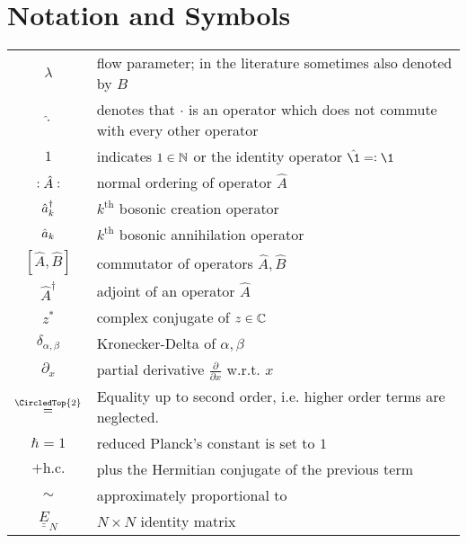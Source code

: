 \chapter*{Notation and Symbols}
\begin{tabular}{cp{}}
  $\lambda$ & flow parameter; in the literature sometimes also denoted by $B$ \\
  $\hat\cdot$ & denotes that $\cdot$ is an operator which does not commute with every other operator\\
  $1$ & indicates $1\in\mathbb{N}$ or the identity operator $\hat{\1}\eqdef \1$\\
  $\vcentcolon \hat A\vcentcolon$ & normal ordering of operator $\hat A$\\ 
  $\hat a^\dagger_k$ & $k^\mathrm{th}$ bosonic creation operator \\
  $\hat a_k$ & $k^\mathrm{th}$ bosonic annihilation operator \\
  $[\hat{ A},\hat{ B}]$ & commutator of operators $\hat{ A},\hat{ B}$ \\
  $\hat A^\dagger$ & adjoint of an operator $\hat{ A}$ \\
  $z^*$ & complex conjugate of $z\in\mathbb{C}$ \\
  $\delta_{\alpha,\beta}$ & Kronecker-Delta of $\alpha,\beta$ \\ 
  $\partial_x$ & partial derivative $\frac{\partial}{\partial x}$ w.r.t. $x$\\
  $\overset{\CircledTop{2}}{=}$ & Equality up to second order, i.e. higher order terms are neglected.\\
  $\hbar=1$ & reduced Planck's constant is set to $1$\\
  $+\mathrm{h.c.}$ & plus the Hermitian conjugate of the previous term\\
  $\sim$ & approximately proportional to\\
  $\underline{\underline E}_N$ & $N\times N$ identity matrix
\end{tabular}\\







